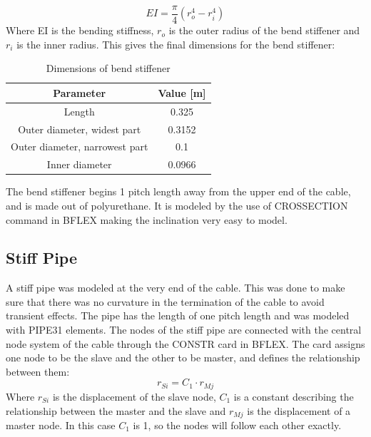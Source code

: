  \begin{equation}
  EI = \frac{\pi}{4}(r_o^4 - r_i^4) 
\end{equation}
 Where EI is the bending stiffness, $r_o$ is the outer radius of the bend stiffener and $r_i$ is the inner radius.\newline 
\newline 
This gives the final dimensions for the bend stiffener: 
 \begin{table} [H]
\centering
\begin{tabular}{ |c|c|}
\hline
Parameter & Value [m] \\
 \hline
 \hline
 
 Length & 0.325 \\
 
Outer diameter, widest part & 0.3152\\

Outer diameter, narrowest part & 0.1\\

 Inner diameter & 0.0966 \\
 

 \hline
\end{tabular}
\caption{Dimensions of bend stiffener}
\label{table:dim}
\end{table}
\noindent The bend stiffener begins 1 pitch length away from the upper end of the cable, and is made out of polyurethane. It is modeled by the use of CROSSECTION command in BFLEX making the inclination very easy to model.  

\subsection{Stiff Pipe}
A stiff pipe was modeled at the very end of the cable. This was done to make sure that there was no curvature in the termination of the cable to avoid transient effects. The pipe has the length of one pitch length and was modeled with PIPE31 elements. The nodes of the stiff pipe are connected with the central node system of the cable through the CONSTR card in BFLEX. The card assigns one node to be the slave and the other to be master, and defines the relationship between them:
\begin{equation}
r_{Si}=C_1 \cdot r_{Mj}    
\end{equation}
Where $r_{Si}$ is the displacement of the slave node,  $C_1$ is a constant describing the relationship between the master and the slave and $r_{Mj}$ is the displacement of a master node.\newline 
\newline 
In this case $C_1$ is 1, so the nodes will follow each other exactly. 

